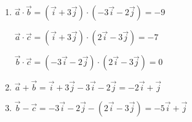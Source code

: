 \begin{enumerate}[label=\alph*)]
    \item $\vec{a}\cdot \vec{b} =(\vec{i}+3\vec{j})\cdot(-3\vec{i}-2\vec{j})=-9$
    
    $\vec{a}\cdot \vec{c} =(\vec{i}+3\vec{j})\cdot(2\vec{i}-3\vec{j})=-7$
    
    $\vec{b}\cdot \vec{c} =(-3\vec{i}-2\vec{j})\cdot(2\vec{i}-3\vec{j})=0$
    
 \item $\vec{a} + \vec{b}= \vec{i}+3\vec{j}-3\vec{i}-2\vec{j}= -2\vec{i}+\vec{j}$
 \item $\vec{b} - \vec{c}=-3\vec{i}-2\vec{j}-(2\vec{i}-3\vec{j})=-5 \vec{i}+\vec{j}$
 
\end{enumerate}
